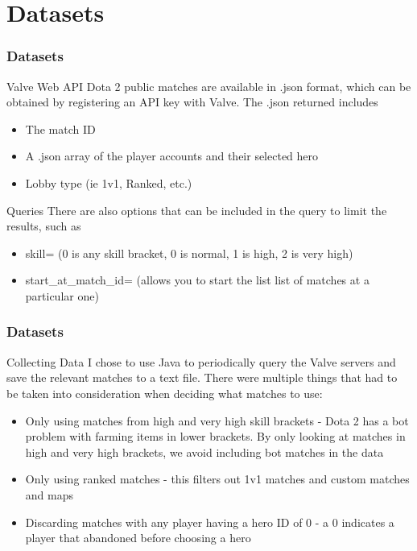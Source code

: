\documentclass{beamer}
\begin{document}
\section{Datasets}

\begin{frame}
\frametitle{Datasets}
\begin{block}{Valve Web API}
Dota 2 public matches are available in .json format, which can be obtained by registering an API key with Valve. The .json returned includes
\begin{itemize}
	\item The match ID
	\item A .json array of the player accounts and their selected hero
	\item Lobby type (ie 1v1, Ranked, etc.)
\end{itemize}
\end{block}
\begin{block}{Queries}
There are also options that can be included in the query to limit the results, such as
\begin{itemize}
	\item skill= (0 is any skill bracket, 0 is normal, 1 is high, 2 is very high)
	\item start\_at\_match\_id= (allows you to start the list list of matches at a particular one)
\end{itemize}
\end{block}
\end{frame}


\begin{frame}
\frametitle{Datasets}

\begin{block}{Collecting Data}
I chose to use Java to periodically query the Valve servers and save the relevant matches to a text file. There were multiple things that had to be taken into consideration when deciding what matches to use:
\begin{itemize}
	\item Only using matches from high and very high skill brackets - Dota 2 has a bot problem with farming items in lower brackets. By only looking at matches in high and very high brackets, we avoid including bot matches in the data
	\item Only using ranked matches - this filters out 1v1 matches and custom matches and maps
	\item Discarding matches with any player having a hero ID of 0 - a 0 indicates a player that abandoned before choosing a hero
\end{itemize}
\end{block}

\end{frame}
\end{document}
